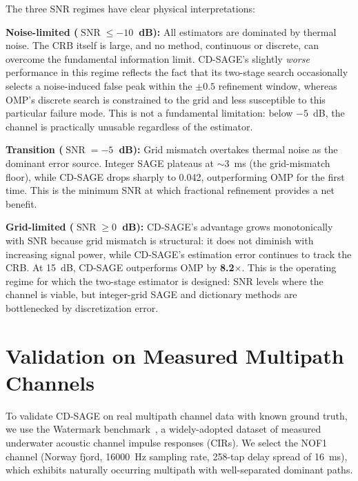 \documentclass[a4paper,fleqn]{cas-dc}
\DeclareMathOperator{\SNR}{SNR}
\begin{document}
The three SNR regimes have clear physical interpretations:

\textbf{Noise-limited ($\SNR \le -10$~dB):} All estimators are dominated by thermal noise. The CRB itself is large, and no method, continuous or discrete, can overcome the fundamental information limit. CD-SAGE's slightly \textit{worse} performance in this regime reflects the fact that its two-stage search occasionally selects a noise-induced false peak within the $\pm 0.5$ refinement window, whereas OMP's discrete search is constrained to the grid and less susceptible to this particular failure mode. This is not a fundamental limitation: below $-5$~dB, the channel is practically unusable regardless of the estimator.

\textbf{Transition ($\SNR = -5$~dB):} Grid mismatch overtakes thermal noise as the dominant error source. Integer SAGE plateaus at $\sim$3~ms (the grid-mismatch floor), while CD-SAGE drops sharply to 0.042, outperforming OMP for the first time. This is the minimum SNR at which fractional refinement provides a net benefit.

\textbf{Grid-limited ($\SNR \ge 0$~dB):} CD-SAGE's advantage grows monotonically with SNR because grid mismatch is structural: it does not diminish with increasing signal power, while CD-SAGE's estimation error continues to track the CRB. At \SI{+15}{dB}, CD-SAGE outperforms OMP by \textbf{8.2$\times$}. This is the operating regime for which the two-stage estimator is designed: SNR levels where the channel is viable, but integer-grid SAGE and dictionary methods are bottlenecked by discretization error.

\section{Validation on Measured Multipath Channels}
\label{sec:watermark}

To validate CD-SAGE on real multipath channel data with known ground truth, we use the Watermark benchmark~\cite{watermark2017}, a widely-adopted dataset of measured underwater acoustic channel impulse responses (CIRs). We select the NOF1 channel (Norway fjord, \SI{16000}{Hz} sampling rate, 258-tap delay spread of \SI{16}{ms}), which exhibits naturally occurring multipath with well-separated dominant paths.
\end{document}
